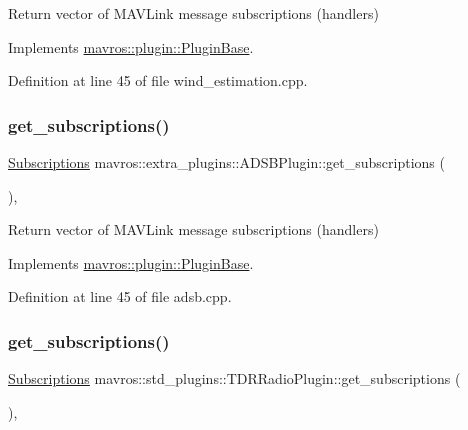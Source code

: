 Return vector of M\+A\+V\+Link message subscriptions (handlers) 



Implements \mbox{\hyperlink{group__plugin_gaf4e23fec6d7436a62cbf0942a2e5791c}{mavros\+::plugin\+::\+Plugin\+Base}}.



Definition at line 45 of file wind\+\_\+estimation.\+cpp.

\mbox{\label{group__plugin_gac151290664f8ba679ec27bd8c55b031e}} 
\subsubsection{\texorpdfstring{get\_subscriptions()}{get\_subscriptions()}\hspace{0.1cm}{\footnotesize\ttfamily [11/41]}}
{\footnotesize\ttfamily \mbox{\hyperlink{group__plugin_ga8967d61fc77040e0c3ea5a4585d62a09}{Subscriptions}} mavros\+::extra\+\_\+plugins\+::\+A\+D\+S\+B\+Plugin\+::get\+\_\+subscriptions (\begin{DoxyParamCaption}{ }\end{DoxyParamCaption})\hspace{0.3cm}{\ttfamily [inline]}, {\ttfamily [virtual]}}



Return vector of M\+A\+V\+Link message subscriptions (handlers) 



Implements \mbox{\hyperlink{group__plugin_gaf4e23fec6d7436a62cbf0942a2e5791c}{mavros\+::plugin\+::\+Plugin\+Base}}.



Definition at line 45 of file adsb.\+cpp.

\mbox{\label{group__plugin_ga2cc39d74800d519194a4f65eea343f16}} 
\subsubsection{\texorpdfstring{get\_subscriptions()}{get\_subscriptions()}\hspace{0.1cm}{\footnotesize\ttfamily [12/41]}}
{\footnotesize\ttfamily \mbox{\hyperlink{group__plugin_ga8967d61fc77040e0c3ea5a4585d62a09}{Subscriptions}} mavros\+::std\+\_\+plugins\+::\+T\+D\+R\+Radio\+Plugin\+::get\+\_\+subscriptions (\begin{DoxyParamCaption}{ }\end{DoxyParamCaption})\hspace{0.3cm}{\ttfamily [inline]}, {\ttfamily [virtual]}}



